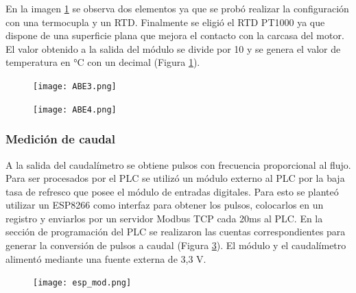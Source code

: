 En la imagen \ref{fig:ABE3} se observa dos elementos ya que se probó realizar la configuración con una termocupla y un RTD. Finalmente se eligió el RTD PT1000 ya que dispone de una superficie plana que mejora el contacto con la carcasa del motor. El valor obtenido a la salida del módulo se divide por 10 y se genera el valor de temperatura en °C con un decimal  (Figura \ref{fig:ABE3}).

\begin{figure}[H]
	\centering
	\texttt{[image: ABE3.png]}
	\label{fig:ABE3}
\end{figure}

\begin{figure}[H]
	\centering
	\texttt{[image: ABE4.png]}
	\label{fig:ABE4}
\end{figure}

\subsubsection{Medición de caudal}
A la salida del caudalímetro se obtiene pulsos con frecuencia proporcional al flujo. Para ser procesados por el PLC se utilizó un módulo externo al PLC por la baja tasa de refresco que posee el módulo de entradas digitales. Para esto se planteó utilizar un ESP8266 como interfaz para obtener los pulsos, colocarlos en un registro y enviarlos por un servidor Modbus TCP cada 20ms al PLC. En la sección de programación del PLC se realizaron las cuentas correspondientes para generar la conversión de pulsos a caudal (Figura \ref{fig:modtcp}). El módulo y el caudalímetro alimentó mediante una fuente externa de 3,3 V.
\begin{figure}[h!]
	\centering
	\texttt{[image: esp\_mod.png]}
	\label{fig:modtcp}
\end{figure}

\newpage

